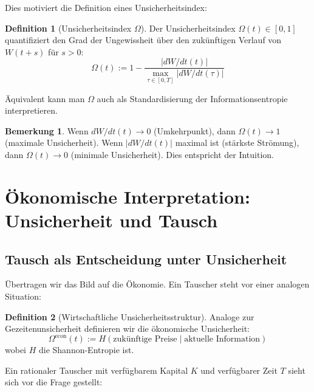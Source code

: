 \documentclass[a4paper,12pt]{article}
\theoremstyle{definition}
\newtheorem{definition}{Definition}
\newtheorem{bemerkung}{Bemerkung}
\begin{document}
Dies motiviert die Definition eines Unsicherheitsindex:

\begin{definition}[Unsicherheitsindex $\Omega$]
    Der Unsicherheitsindex $\Omega(t) \in [0,1]$ quantifiziert den Grad der Ungewissheit über den zukünftigen Verlauf von $W(t+s)$ für $s > 0$:
    \begin{equation}
        \Omega(t) := 1 - \frac{|dW/dt(t)|}{\max_{\tau \in [0,T]} |dW/dt(\tau)|}
    \end{equation}
    
    Äquivalent kann man $\Omega$ auch als Standardisierung der Informationsentropie interpretieren.
\end{definition}

\begin{bemerkung}
    Wenn $dW/dt(t) \to 0$ (Umkehrpunkt), dann $\Omega(t) \to 1$ (maximale Unsicherheit). Wenn $|dW/dt(t)|$ maximal ist (stärkste Strömung), dann $\Omega(t) \to 0$ (minimale Unsicherheit). Dies entspricht der Intuition.
\end{bemerkung}

\section{Ökonomische Interpretation: Unsicherheit und Tausch}

\subsection{Tausch als Entscheidung unter Unsicherheit}

Übertragen wir das Bild auf die Ökonomie. Ein Tauscher steht vor einer analogen Situation:

\begin{definition}[Wirtschaftliche Unsicherheitsstruktur]
    Analoge zur Gezeitenunsicherheit definieren wir die ökonomische Unsicherheit:
    \begin{equation}
        \Omega^{\text{econ}}(t) := H\left(\text{zukünftige Preise} \mid \text{aktuelle Information}\right)
    \end{equation}
    wobei $H$ die Shannon-Entropie ist.
\end{definition}

Ein rationaler Tauscher mit verfügbarem Kapital $K$ und verfügbarer Zeit $T$ sieht sich vor die Frage gestellt:
\end{document}
